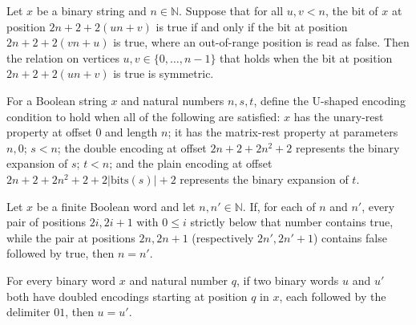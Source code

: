 \begin{lemma}
\label{Complexity.symmetric_inEdge}
\leanok
{}
Let $x$ be a binary string and $n\in\mathbb{N}$. Suppose that for all $u,v<n$, the bit
of $x$ at position $2n+2+2(un+v)$ is true if and only if the bit at position
$2n+2+2(vn+u)$ is true, where an out-of-range position is read as false. Then the
relation on vertices $u,v\in\{0,\ldots,n-1\}$ that holds when the bit at position
$2n+2+2(un+v)$ is true is symmetric.
\end{lemma}

\begin{definition}
\label{Complexity.UShape}
\leanok
{}
For a Boolean string $x$ and natural numbers $n,s,t$, define the U-shaped encoding
condition to hold when all of the following are satisfied: $x$ has the unary-rest
property at offset $0$ and length $n$; it has the matrix-rest property at parameters
$n,0$; $s<n$; the double encoding at offset $2n+2+2n^2+2$ represents the binary
expansion of $s$; $t<n$; and the plain encoding at offset
$2n+2+2n^2+2+2\lvert\mathrm{bits}(s)\rvert+2$ represents the binary expansion of $t$.
\end{definition}

\begin{lemma}
\label{Complexity.unaryRest_unique}
\leanok
{}
Let $x$ be a finite Boolean word and let $n,n'\in\mathbb{N}$. If, for each of $n$ and
$n'$, every pair of positions $2i,2i+1$ with $0\le i$ strictly below that number
contains true, while the pair at positions $2n,2n+1$ (respectively $2n',2n'+1$) contains
false followed by true, then $n=n'$.
\end{lemma}

\begin{lemma}
\label{Complexity.dblAt_unique}
\leanok
{}
For every binary word $x$ and natural number $q$, if two binary words $u$ and $u'$ both
have doubled encodings starting at position $q$ in $x$, each followed by the delimiter
$01$, then $u=u'$.
\end{lemma}

